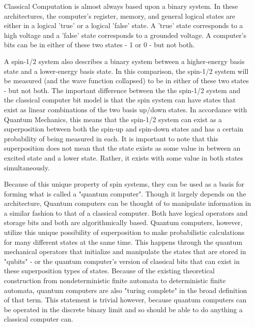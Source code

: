 \documentclass[oneside, astronomy, noacknowlegments]{BYUPhys}
\begin{document}
Classical Computation is almost always based upon a binary system. In these architectures, the computer's register, memory, and general logical states are either in a logical 'true' or a logical 'false' state. A 'true' state corresponds to a high voltage and a 'false' state corresponds to a grounded voltage. A computer's bits can be in either of these two states - 1 or 0 - but not both.

A spin-1/2 system also describes a binary system between a higher-energy basis state and a lower-energy basis state. In this comparison, the spin-1/2 system will be measured (and the wave function collapsed) to be in either of these two states - but not both. The important difference between the the spin-1/2 system and the classical computer bit model is that the spin system can have states that exist as linear combinations of the two basis up/down states. In accordance with Quantum Mechanics, this means that the spin-1/2 system can exist as a superposition between both the spin-up and spin-down states and has a certain probability of being measured in each. It is important to note that this superposition does not mean that the state exists as some value in between an excited state and a lower state. Rather, it exists with some value in both states simultaneously.

Because of this unique property of spin systems, they can be used as a basis for forming what is called a "quantum computer". Though it largely depends on the architecture, Quantum computers can be thought of to manipulate information in a similar fashion to that of a classical computer. Both have logical operators and storage bits and both are algorithmically based. Quantum computers, however, utilize this unique possibility of superposition to make probabilistic calculations for many different states at the same time. This happens through the quantum mechanical operators that initialize and manipulate the states that are stored in "qubits" - or the quantum computer's version of classical bits that can exist in these superposition types of states. Because of the existing theoretical construction from nondeterministic finite automata to deterministic finite automata, quantum computers are also "turing complete" in the broad definition of that term. This statement is trivial however, because quantum computers can be operated in the discrete binary limit and so should be able to do anything a classical computer can.
\end{document}
